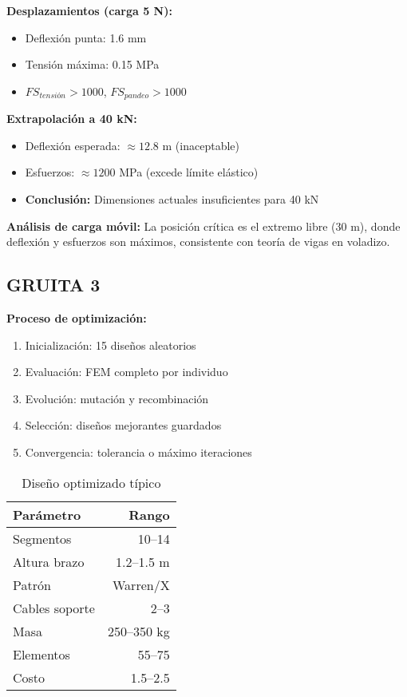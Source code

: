 \documentclass[10pt,a4paper]{article}
\begin{document}
\textbf{Desplazamientos (carga 5 N):}
\begin{itemize}
\item Deflexión punta: 1.6 mm
\item Tensión máxima: 0.15 MPa
\item $FS_{tensión} > 1000$, $FS_{pandeo} > 1000$
\end{itemize}

\textbf{Extrapolación a 40 kN:}
\begin{itemize}
\item Deflexión esperada: $\approx 12.8$ m (inaceptable)
\item Esfuerzos: $\approx 1200$ MPa (excede límite elástico)
\item \textbf{Conclusión:} Dimensiones actuales insuficientes para 40 kN
\end{itemize}

\textbf{Análisis de carga móvil:} La posición crítica es el extremo libre (30 m), donde deflexión y esfuerzos son máximos, consistente con teoría de vigas en voladizo.

\subsection{GRUITA 3}

\textbf{Proceso de optimización:}
\begin{enumerate}
\item Inicialización: 15 diseños aleatorios
\item Evaluación: FEM completo por individuo
\item Evolución: mutación y recombinación
\item Selección: diseños mejorantes guardados
\item Convergencia: tolerancia o máximo iteraciones
\end{enumerate}

\begin{table}[H]
\small
\centering
\caption{Diseño optimizado típico}
\begin{tabular}{lr}
\toprule
\textbf{Parámetro} & \textbf{Rango} \\
\midrule
Segmentos & 10--14 \\
Altura brazo & 1.2--1.5 m \\
Patrón & Warren/X \\
Cables soporte & 2--3 \\
\midrule
Masa & 250--350 kg \\
Elementos & 55--75 \\
Costo & 1.5--2.5 \\
\bottomrule
\end{tabular}
\end{table}
\end{document}
